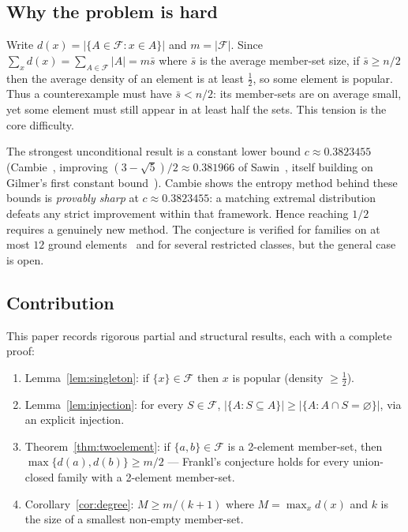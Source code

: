 \documentclass[11pt]{article}
\theoremstyle{definition}
\theoremstyle{remark}
\newcommand{\cF}{\mathcal{F}}
\newcommand{\emp}{\varnothing}
\newcommand{\Nhalf}{\tfrac{1}{2}}
\begin{document}
\subsection*{Why the problem is hard}

Write $d(x)=|\{A\in\cF:x\in A\}|$ and $m=|\cF|$. Since
$\sum_x d(x)=\sum_{A\in\cF}|A|=m\bar s$ where $\bar s$ is the average
member-set size, if $\bar s\ge n/2$ then the average density of an element is
at least $\Nhalf$, so some element is popular. Thus a counterexample must have
$\bar s<n/2$: its member-sets are on average small, yet some element must still
appear in at least half the sets. This tension is the core difficulty.

The strongest unconditional result is a constant lower bound
$c\approx0.3823455$ (Cambie~\cite{cambie2025}, improving
$(3-\sqrt5)/2\approx0.381966$ of Sawin~\cite{sawin2022}, itself building on
Gilmer's first constant bound~\cite{gilmer2022}). Cambie shows the entropy
method behind these bounds is \emph{provably sharp} at
$c\approx0.3823455$: a matching extremal distribution defeats any strict
improvement within that framework. Hence reaching $1/2$ requires a genuinely
new method. The conjecture is verified for families on at most $12$ ground
elements~\cite{zivkovic2024} and for several restricted classes, but the
general case is open.

\subsection*{Contribution}

This paper records rigorous partial and structural results, each with a
complete proof:

\begin{enumerate}
\item Lemma~\ref{lem:singleton}: if $\{x\}\in\cF$ then $x$ is popular
  (density $\ge \Nhalf$).
\item Lemma~\ref{lem:injection}: for every $S\in\cF$,
  $|\{A:S\subseteq A\}|\ge|\{A:A\cap S=\emp\}|$, via an explicit injection.
\item Theorem~\ref{thm:twoelement}: if $\{a,b\}\in\cF$ is a 2-element
  member-set, then $\max\{d(a),d(b)\}\ge m/2$ --- Frankl's conjecture holds
  for every union-closed family with a 2-element member-set.
\item Corollary~\ref{cor:degree}: $M\ge m/(k+1)$ where $M=\max_x d(x)$ and
  $k$ is the size of a smallest non-empty member-set.
\end{enumerate}
\end{document}
